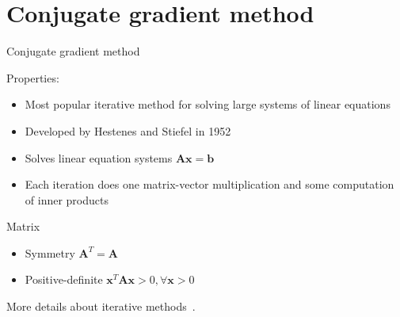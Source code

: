 \documentclass[\classoption]{beamer}
\begin{document}
\section{Conjugate gradient method}

\begin{frame}{Conjugate gradient method}

\begin{block}{Properties:}
\begin{itemize}
\item Most popular iterative method for solving large systems of linear equations
\item Developed by Hestenes and Stiefel in 1952~\cite{hestenes1952methods}
\item Solves linear equation systems $\mathbf{A} \mathbf{x} = \mathbf{b}$
\item Each iteration does one matrix-vector multiplication and some computation of inner products
\end{itemize}
\end{block}

\begin{block}{Matrix}
\begin{itemize}
\item Symmetry $\mathbf{A}^T = \mathbf{A}$
\item Positive-definite $\mathbf{x}^T \mathbf{A} \mathbf{x} > 0, \forall \mathbf{x}>0$
\end{itemize}
\end{block}

More details about iterative methods~\cite{briggs2000multigrid}.
\end{frame}
\end{document}

